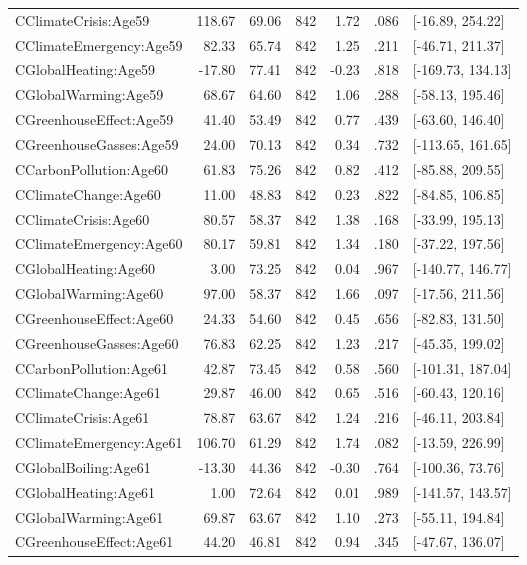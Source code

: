 \begin{table}[ht]
\begin{tabular}{lrrrrrl}
  CClimateCrisis:Age59 & 118.67 & 69.06 & 842 & 1.72 & .086 & [-16.89, 254.22] \\ 
  CClimateEmergency:Age59 & 82.33 & 65.74 & 842 & 1.25 & .211 & [-46.71, 211.37] \\ 
  CGlobalHeating:Age59 & -17.80 & 77.41 & 842 & -0.23 & .818 & [-169.73, 134.13] \\ 
  CGlobalWarming:Age59 & 68.67 & 64.60 & 842 & 1.06 & .288 & [-58.13, 195.46] \\ 
  CGreenhouseEffect:Age59 & 41.40 & 53.49 & 842 & 0.77 & .439 & [-63.60, 146.40] \\ 
  CGreenhouseGasses:Age59 & 24.00 & 70.13 & 842 & 0.34 & .732 & [-113.65, 161.65] \\ 
  CCarbonPollution:Age60 & 61.83 & 75.26 & 842 & 0.82 & .412 & [-85.88, 209.55] \\ 
  CClimateChange:Age60 & 11.00 & 48.83 & 842 & 0.23 & .822 & [-84.85, 106.85] \\ 
  CClimateCrisis:Age60 & 80.57 & 58.37 & 842 & 1.38 & .168 & [-33.99, 195.13] \\ 
  CClimateEmergency:Age60 & 80.17 & 59.81 & 842 & 1.34 & .180 & [-37.22, 197.56] \\ 
  CGlobalHeating:Age60 & 3.00 & 73.25 & 842 & 0.04 & .967 & [-140.77, 146.77] \\ 
  CGlobalWarming:Age60 & 97.00 & 58.37 & 842 & 1.66 & .097 & [-17.56, 211.56] \\ 
  CGreenhouseEffect:Age60 & 24.33 & 54.60 & 842 & 0.45 & .656 & [-82.83, 131.50] \\ 
  CGreenhouseGasses:Age60 & 76.83 & 62.25 & 842 & 1.23 & .217 & [-45.35, 199.02] \\ 
  CCarbonPollution:Age61 & 42.87 & 73.45 & 842 & 0.58 & .560 & [-101.31, 187.04] \\ 
  CClimateChange:Age61 & 29.87 & 46.00 & 842 & 0.65 & .516 & [-60.43, 120.16] \\ 
  CClimateCrisis:Age61 & 78.87 & 63.67 & 842 & 1.24 & .216 & [-46.11, 203.84] \\ 
  CClimateEmergency:Age61 & 106.70 & 61.29 & 842 & 1.74 & .082 & [-13.59, 226.99] \\ 
  CGlobalBoiling:Age61 & -13.30 & 44.36 & 842 & -0.30 & .764 & [-100.36, 73.76] \\ 
  CGlobalHeating:Age61 & 1.00 & 72.64 & 842 & 0.01 & .989 & [-141.57, 143.57] \\ 
  CGlobalWarming:Age61 & 69.87 & 63.67 & 842 & 1.10 & .273 & [-55.11, 194.84] \\ 
  CGreenhouseEffect:Age61 & 44.20 & 46.81 & 842 & 0.94 & .345 & [-47.67, 136.07] \\ 

\end{tabular}
\end{table}
